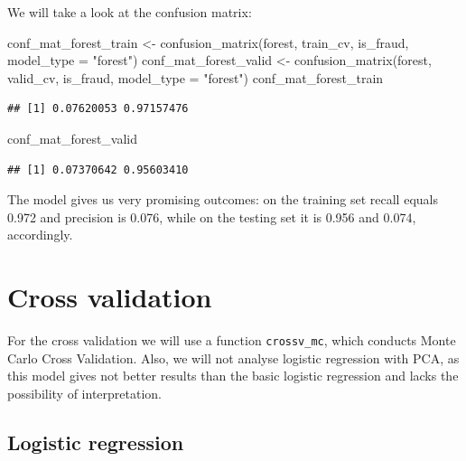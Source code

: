 \documentclass[
]{report}
\newenvironment{Shaded}{\begin{snugshade}}{\end{snugshade}}
\newcommand{\AttributeTok}[1]{\textcolor[rgb]{0.77,0.63,0.00}{#1}}
\newcommand{\FunctionTok}[1]{\textcolor[rgb]{0.00,0.00,0.00}{#1}}
\newcommand{\NormalTok}[1]{#1}
\newcommand{\OtherTok}[1]{\textcolor[rgb]{0.56,0.35,0.01}{#1}}
\newcommand{\StringTok}[1]{\textcolor[rgb]{0.31,0.60,0.02}{#1}}
\begin{document}
We will take a look at the confusion matrix:

\begin{Shaded}
\begin{Highlighting}[]
\NormalTok{conf\_mat\_forest\_train }\OtherTok{\textless{}{-}} \FunctionTok{confusion\_matrix}\NormalTok{(forest, train\_cv, }\StringTok{\textquotesingle{}is\_fraud\textquotesingle{}}\NormalTok{, }\AttributeTok{model\_type =} \StringTok{"forest"}\NormalTok{)}
\NormalTok{conf\_mat\_forest\_valid }\OtherTok{\textless{}{-}} \FunctionTok{confusion\_matrix}\NormalTok{(forest, valid\_cv, }\StringTok{\textquotesingle{}is\_fraud\textquotesingle{}}\NormalTok{, }\AttributeTok{model\_type =} \StringTok{"forest"}\NormalTok{)}
\NormalTok{conf\_mat\_forest\_train}
\end{Highlighting}
\end{Shaded}

\begin{verbatim}
## [1] 0.07620053 0.97157476
\end{verbatim}

\begin{Shaded}
\begin{Highlighting}[]
\NormalTok{conf\_mat\_forest\_valid}
\end{Highlighting}
\end{Shaded}

\begin{verbatim}
## [1] 0.07370642 0.95603410
\end{verbatim}

The model gives us very promising outcomes: on the training set recall
equals 0.972 and precision is 0.076, while on the testing set it is
0.956 and 0.074, accordingly.

\hypertarget{cross-validation-1}{%
\chapter{Cross validation}\label{cross-validation-1}}

For the cross validation we will use a function \texttt{crossv\_mc},
which conducts Monte Carlo Cross Validation. Also, we will not analyse
logistic regression with PCA, as this model gives not better results
than the basic logistic regression and lacks the possibility of
interpretation.

\hypertarget{logistic-regression-1}{%
\section{Logistic regression}\label{logistic-regression-1}}
\end{document}
